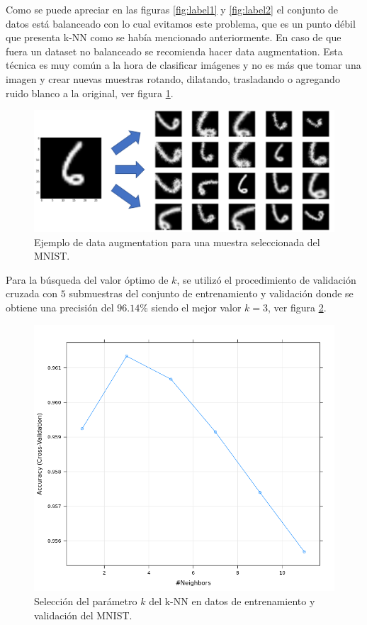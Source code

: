 \documentclass[12pt]{report} %
\theoremstyle{definition}
\begin{document}
{Como se puede apreciar en las figuras \ref{fig:label1} y \ref{fig:label2} el conjunto de datos está balanceado con lo cual evitamos este problema, que es un punto débil que presenta k-NN como se había mencionado anteriormente. En caso de que fuera un dataset no balanceado se recomienda hacer data augmentation. Esta técnica es muy común a la hora de clasificar imágenes y no es más que tomar una imagen y crear nuevas muestras rotando, dilatando, trasladando o agregando ruido blanco a la original, ver figura \ref{fig:dataaug}.

\begin{figure}[H]
	\centering
	\includegraphics[scale=0.6]{imagenes/dataaug.png}
	\caption{Ejemplo de data augmentation para una muestra seleccionada del MNIST.}
	\label{fig:dataaug}
\end{figure}

Para la búsqueda del valor óptimo de $k$, se utilizó el procedimiento de validación cruzada con $5$ submuestras del conjunto de entrenamiento y validación donde se obtiene una precisión del $96.14\%$ siendo el mejor valor $k=3$, ver figura \ref{fig:modelo1}.

\begin{figure}[H]
	\centering
	\includegraphics[scale=0.6]{imagenes/knn.png}
	\caption{Selección del parámetro $k$ del k-NN en datos de entrenamiento y validación del MNIST.}
	\label{fig:modelo1}
\end{figure}

}
\end{document}

